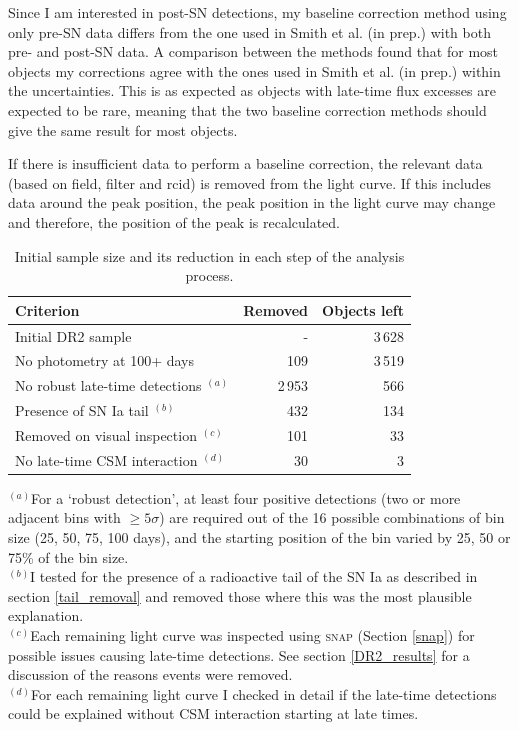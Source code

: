 \documentclass[a4paper,oneside,12pt, class=Latex/Classes/PhDthesisPSnPDF, crop=false]{standalone}
\begin{document}
Since I am interested in post-SN detections, my baseline correction method using only pre-SN data differs from the one used in Smith et al. (in prep.) with both pre- and post-SN data. A comparison between the methods found that for most objects my corrections agree with the ones used in Smith et al. (in prep.) within the uncertainties. This is as expected as objects with late-time flux excesses are expected to be rare, meaning that the two baseline correction methods should give the same result for most objects.

If there is insufficient data to perform a baseline correction, the relevant data (based on field, filter and rcid) is removed from the light curve. If this includes data around the peak position, the peak position in the light curve may change and therefore, the position of the peak is recalculated.


\begin{table}
 \centering
 \caption[DR2 sample size and its reduction in each step of the analysis process.]{Initial sample size and its reduction in each step of the analysis process.}
 \begin{tabular}{lrr}
  \hline
  Criterion & Removed & Objects left\\
  \hline
  Initial DR2 sample & - & 3\,628\\
  No photometry at 100+ days & 109 & 3\,519\\
   No robust late-time detections $^{(a)}$ & 2\,953 & 566\\
  Presence of SN Ia tail $^{(b)}$ & 432 & 134\\
  Removed on visual inspection $^{(c)}$ & 101 & 33\\
  No late-time CSM interaction $^{(d)}$ & 30 & 3\\
  \hline
 \end{tabular}
 \label{obj_breakdown}
\begin{flushleft}
$^{(a)}$For a `robust detection', at least four positive detections (two or more adjacent bins with $\ge5\sigma$) are required out of the 16 possible combinations of bin size (25, 50, 75, 100 days), and the starting position of the bin varied by 25, 50 or 75\% of the bin size. \\
$^{(b)}$I tested for the presence of a radioactive tail of the SN Ia as described in section \ref{tail_removal} and removed those where this was the most plausible explanation. \\
$^{(c)}$Each remaining light curve was inspected using \textsc{snap} (Section \ref{snap}) for possible issues causing late-time detections. See section \ref{DR2_results} for a discussion of the reasons events were removed.\\
$^{(d)}$For each remaining light curve I checked in detail if the late-time detections could be explained without CSM interaction starting at late times.
\end{flushleft}
\end{table}
\end{document}
